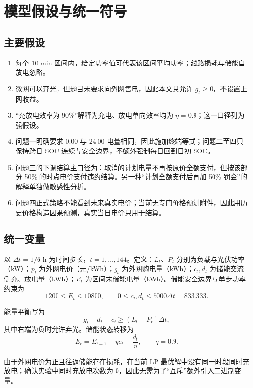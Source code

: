 \section{模型假设与统一符号}

\subsection{主要假设}

\begin{enumerate}
\item 每个 10 min 区间内，给定功率值可代表该区间平均功率；线路损耗与储能自放电忽略。
\item 微网可以弃光，但题目未要求向外网售电，因此本文只允许 $g_t\ge 0$，不设置上网收益。
\item ``充放电效率为 90\%''解释为充电、放电单向效率均为 $\eta=0.9$；这一口径列为强假设。
\item 问题一明确要求 0:00 与 24:00 电量相同，因此施加终端等式；问题二至四只保持跨日 SOC 连续与安全边界，不额外强制每日回到日初 SOC。
\item 问题三的下调结算主口径为：取消的计划电量不再按原价全额支付，但按该部分 50\% 的时点电价支付违约结算。另一种``计划全额支付后再加 50\% 罚金''的解释单独做敏感性分析。
\item 问题四正式策略不能看到未来真实电价；当前无专门价格预测附件，因此用历史价格构造因果预测，真实当日电价只用于结算。
\end{enumerate}

\subsection{统一变量}

以 $\Delta t=1/6$ h 为时间步长，$t=1,\ldots,144$。定义：$L_t$、$P_t$ 分别为负载与光伏功率（kW）；$p_t$ 为外网电价（元/kWh）；$g_t$ 为外网购电量（kWh）；$c_t,d_t$ 为储能交流侧充、放电量（kWh）；$E_t$ 为区间末储能电量（kWh）。储能安全边界与单步功率约束为
\[
1200\le E_t\le10800,\qquad 0\le c_t,d_t\le 5000\Delta t=833.333.
\]

能量平衡写为
\[
g_t+d_t-c_t\ge (L_t-P_t)\Delta t,
\tag{1}
\]
其中右端为负时允许弃光。储能状态转移为
\[
E_t=E_{t-1}+\eta c_t-\frac{d_t}{\eta},\qquad \eta=0.9.
\tag{2}
\]

由于外网电价为正且往返储能存在损耗，在当前 LP 最优解中没有同一时段同时充放电；确认实验中同时充放电次数为 0，因此无需为了``互斥''额外引入二进制变量。
